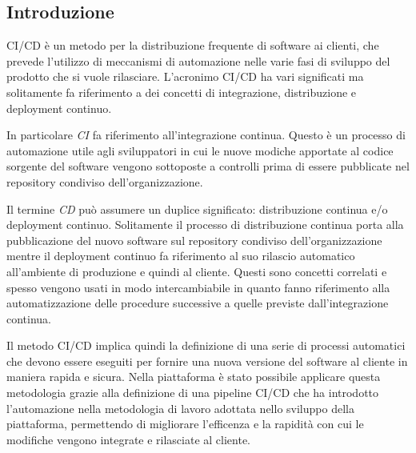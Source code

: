 \subsection{Introduzione}
CI/CD è un metodo per la distribuzione frequente di software ai clienti, che prevede l'utilizzo di meccanismi
di automazione nelle varie fasi di sviluppo del prodotto che si vuole rilasciare.
L'acronimo CI/CD ha vari significati ma solitamente fa riferimento a dei concetti di integrazione, distribuzione
e deployment continuo.

In particolare \textit{CI} fa riferimento all'integrazione continua. Questo è un processo di automazione
utile agli sviluppatori in cui le nuove modiche apportate al codice sorgente del software vengono
sottoposte a controlli prima di essere pubblicate nel repository condiviso dell'organizzazione.

Il termine \textit{CD} può assumere un duplice significato: distribuzione continua e/o deployment continuo.
Solitamente il processo di distribuzione continua porta alla pubblicazione del nuovo software sul repository condiviso dell'organizzazione
mentre il deployment continuo fa riferimento al suo rilascio automatico all'ambiente di produzione e quindi al cliente.
Questi sono concetti correlati e spesso vengono usati in modo intercambiabile in quanto fanno riferimento
alla automatizzazione delle procedure successive a quelle previste dall'integrazione continua.

Il metodo CI/CD implica quindi la definizione di una serie di processi automatici che devono
essere eseguiti per fornire una nuova versione del software al cliente in maniera rapida e sicura.
Nella piattaforma è stato possibile applicare questa metodologia grazie alla definizione di una pipeline CI/CD che ha
introdotto l'automazione nella metodologia di lavoro adottata nello sviluppo
della piattaforma, permettendo di migliorare l'efficenza e la rapidità con cui le modifiche vengono
integrate e rilasciate al cliente.